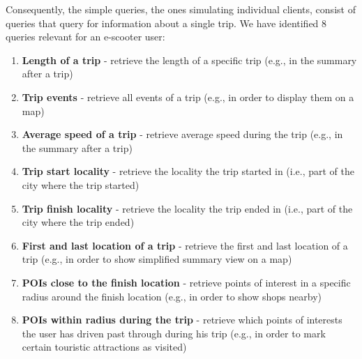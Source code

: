 Consequently, the simple queries, the ones simulating individual clients, consist of queries that query for information about a single trip.
We have identified 8 queries relevant for an e-scooter user:
\begin{enumerate}
	\item \textbf{Length of a trip} - retrieve the length of a specific trip (e.g., in the summary after a trip)
	\item \textbf{Trip events} - retrieve all events of a trip (e.g., in order to display them on a map)
	\item \textbf{Average speed of a trip} - retrieve average speed during the trip (e.g., in the summary after a trip)
	\item \textbf{Trip start locality} - retrieve the locality the trip started in (i.e., part of the city where the trip started)
	\item \textbf{Trip finish locality} - retrieve the locality the trip ended in (i.e., part of the city where the trip ended)
	\item \textbf{First and last location of a trip} - retrieve the first and last location of a trip (e.g., in order to show simplified summary view on a map)
	\item \textbf{POIs close to the finish location} - retrieve points of interest in a specific radius around the finish location (e.g., in order to show shops nearby)
	\item \textbf{POIs within radius during the trip} - retrieve which points of interests the user has driven past through during his trip (e.g., in order to mark certain touristic attractions as visited)
\end{enumerate}


